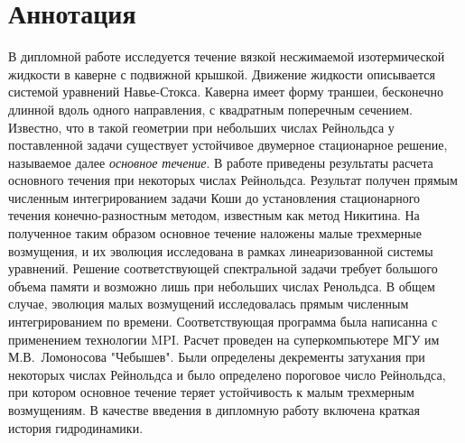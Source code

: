 \documentclass{scrartcl}
\begin{document}
\newpage
\tableofcontents
\newpage

\section{Аннотация}
  В дипломной работе исследуется течение вязкой несжимаемой изотермической жидкости в каверне с подвижной крышкой. 
  Движение жидкости описывается системой уравнений Навье-Стокса. Каверна имеет форму траншеи, бесконечно длинной 
  вдоль одного направления, с квадратным поперечным сечением. Известно, что в такой геометрии при небольших числах 
  Рейнольдса у поставленной задачи
  существует устойчивое двумерное стационарное решение, называемое далее \textit{основное течение}. В работе приведены результаты
  расчета основного течения при некоторых числах Рейнольдса. Результат получен прямым численным интегрированием задачи 
  Коши до установления стационарного течения конечно-разностным методом, известным как метод Никитина. 
  На полученное таким образом основное течение наложены малые 
  трехмерные возмущения, и их эволюция исследована в рамках линеаризованной системы уравнений. Решение 
  соответствующей спектральной задачи требует большого объема памяти и возможно лишь при небольших числах Ренольдса.
  В общем случае, эволюция малых возмущений исследовалась прямым численным интегрированием по времени. 
  Соответствующая программа была написанна с применением технологии MPI. Расчет проведен на суперкомпьютере 
  МГУ им М.В.~Ломоносова "Чебышев". Были определены декременты затухания при некоторых числах Рейнольдса и было 
  определено пороговое число Рейнольдса, при котором основное течение теряет устойчивость к малым трехмерным возмущениям. 
  В качестве введения в дипломную работу включена краткая история гидродинамики.

\newpage  
  
  
%  
%  
  
  
%  
  

\newpage
\end{document}
